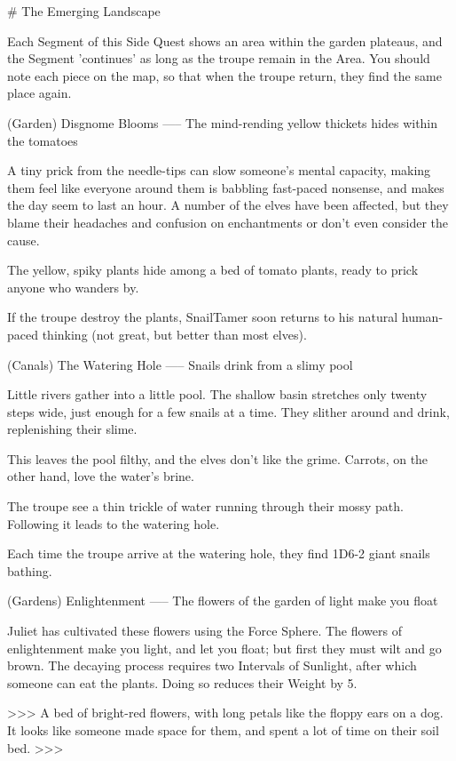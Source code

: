 # The Emerging Landscape

Each Segment of this Side Quest shows an area within the garden plateaus, and the Segment 'continues' as long as the troupe remain in the Area.
You should note each piece on the map, so that when the troupe return, they find the same place again.

(Garden) Disgnome Blooms
-----
{The mind-rending yellow thickets hides within the tomatoes}

A tiny prick from the needle-tips can slow someone's mental capacity, making them feel like everyone around them is babbling fast-paced nonsense, and makes the day seem to last an hour.
A number of the elves have been affected, but they blame their headaches and confusion on enchantments or don't even consider the cause.

The yellow, spiky plants hide among a bed of tomato plants, ready to prick anyone who wanders by.

If the troupe destroy the plants,
SnailTamer soon returns to his natural human-paced thinking (not great, but better than most elves).

(Canals) The Watering Hole
-----
{Snails drink from a slimy pool}

Little rivers gather into a little pool.
The shallow basin stretches only twenty steps wide, just enough for a few snails at a time.
They slither around and drink, replenishing their slime.

This leaves the pool filthy, and the elves don't like the grime.
Carrots, on the other hand, love the water's brine.

The troupe see a thin trickle of water running through their mossy path.
Following it leads to the watering hole.

Each time the troupe arrive at the watering hole,
they find 1D6-2 giant snails bathing.

(Gardens) Enlightenment
-----
{The flowers of the garden of light make you float}

Juliet has cultivated these flowers using the Force Sphere.
The flowers of enlightenment make you light, and let you float; but first they must wilt and go brown.
The decaying process requires two Intervals of Sunlight, after which someone can eat the plants.
Doing so reduces their Weight by 5.

>>>
A bed of bright-red flowers, with long petals like the floppy ears on a dog.
It looks like someone made space for them, and spent a lot of time on their soil bed.
>>>

